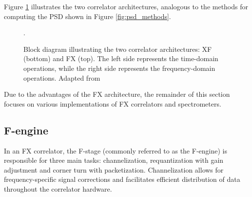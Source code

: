 Figure \ref{fig:corr_methods} illustrates the two correlator architectures, analogous to the methods for computing the PSD shown in Figure \ref{fig:psd_methods}.
\begin{figure}[t]
	\centering
	\caption[Correlator architectures]{Block diagram illustrating the two correlator architectures: XF (bottom) and FX (top). The left side represents the time-domain operations, while the right side represents the frequency-domain operations. Adapted from \citet{thompson2017interferometry}}.
	\label{fig:corr_methods}
\end{figure}
Due to the advantages of the FX architecture, the remainder of this section focuses on various implementations of FX correlators and spectrometers.
\subsection{F-engine}
In an FX correlator, the F-stage (commonly referred to as the F-engine) is responsible for three main tasks: channelization, requantization with gain adjustment and corner turn with packetization. Channelization allows for frequency-specific signal corrections and facilitates efficient distribution of data throughout the correlator hardware.

